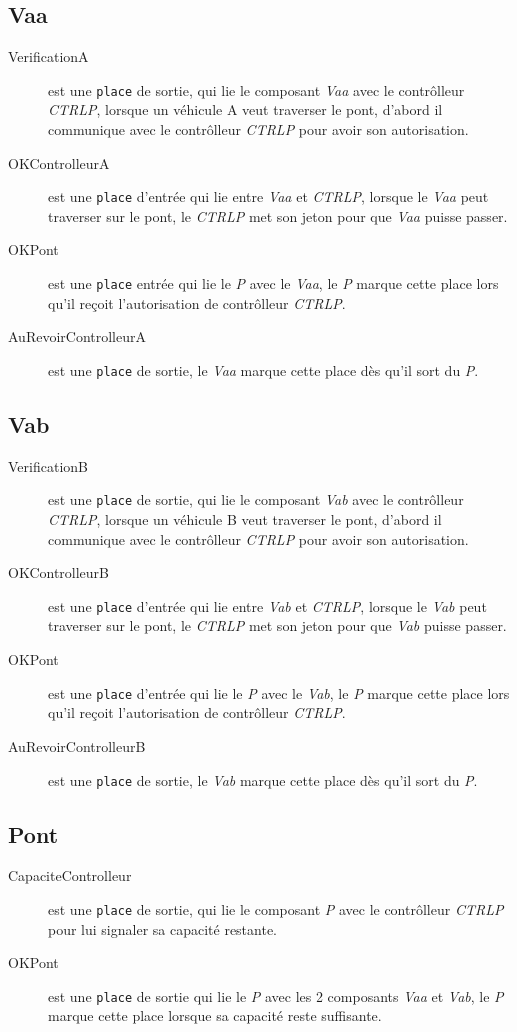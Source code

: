 \documentclass[a4paper,11pt]{report}
\begin{document}
\subsection{Vaa}
	\begin{description}
		\item[VerificationA] est une \texttt{place} de sortie, qui lie le composant \textit{Vaa} avec le contrôlleur \textit{CTRLP}, lorsque un véhicule A veut traverser le pont, d'abord il communique avec le contrôlleur \textit{CTRLP} pour avoir son autorisation.
		\item[OKControlleurA] est une \texttt{place} d'entrée qui lie entre \textit{Vaa} et \textit{CTRLP}, lorsque le \textit{Vaa} peut traverser sur le pont, le \textit{CTRLP} met son jeton pour que \textit{Vaa} puisse passer.
		\item[OKPont] est une \texttt{place} entrée qui lie le \textit{P} avec le \textit{Vaa}, le \textit{P} marque cette place lors qu'il reçoit l'autorisation de contrôlleur \textit{CTRLP}.
		\item[AuRevoirControlleurA] est une \texttt{place} de sortie, le \textit{Vaa} marque cette place dès qu'il sort du \textit{P}.
	\end{description}	
	
	\subsection{Vab}
	\begin{description}
		\item[VerificationB] est une \texttt{place} de sortie, qui lie le composant \textit{Vab} avec le contrôlleur \textit{CTRLP}, lorsque un véhicule B veut traverser le pont, d'abord il communique avec le contrôlleur \textit{CTRLP} pour avoir son autorisation.
		\item[OKControlleurB] est une \texttt{place} d'entrée qui lie entre \textit{Vab} et \textit{CTRLP}, lorsque le \textit{Vab} peut traverser sur le pont, le \textit{CTRLP} met son jeton pour que \textit{Vab} puisse passer.
		\item[OKPont] est une \texttt{place} d'entrée qui lie le \textit{P} avec le \textit{Vab}, le \textit{P} marque cette place lors qu'il reçoit l'autorisation de contrôlleur \textit{CTRLP}.
		\item[AuRevoirControlleurB] est une \texttt{place} de sortie, le \textit{Vab} marque cette place dès qu'il sort du \textit{P}.
	\end{description}	
	
	\subsection{Pont}
	\begin{description}
		\item[CapaciteControlleur] est une \texttt{place} de sortie, qui lie le composant \textit{P} avec le contrôlleur \textit{CTRLP} pour lui signaler sa capacité restante.
		\item[OKPont] est une \texttt{place} de sortie qui lie le \textit{P} avec les 2 composants \textit{Vaa} et \textit{Vab}, le \textit{P} marque cette place lorsque sa capacité reste suffisante.
	\end{description}	
	
\end{document}
